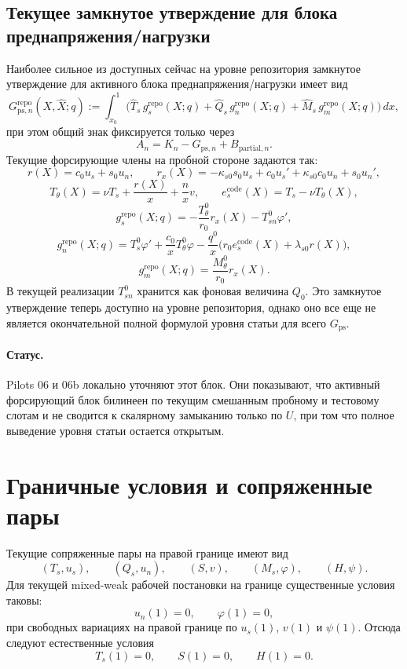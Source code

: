 \documentclass[11pt,a4paper]{article}
\begin{document}
\subsection{Текущее замкнутое утверждение для блока преднапряжения/нагрузки}
Наиболее сильное из доступных сейчас на уровне репозитория замкнутое
утверждение для активного блока преднапряжения/нагрузки имеет вид
\[
G_{\mathrm{ps},n}^{\mathrm{repo}}(X,\widehat X;q)
:= \int_{x_0}^1
\bigl( \widehat T_s\, g_s^{\mathrm{repo}}(X;q)
     + \widehat Q_s\, g_n^{\mathrm{repo}}(X;q)
     + \widehat M_s\, g_m^{\mathrm{repo}}(X;q)
\bigr)\,dx,
\]
при этом общий знак фиксируется только через
\[
A_n = K_n - G_{\mathrm{ps},n} + B_{\mathrm{partial},n}.
\]
Текущие форсирующие члены на пробной стороне задаются так:
\[
r(X)=c_0u_s+s_0u_n,
\qquad
r_x(X)= -\kappa_{s0}s_0u_s + c_0u_s' + \kappa_{s0}c_0u_n + s_0u_n',
\]
\[
T_\theta(X) = \nu T_s + \frac{r(X)}{x} + \frac{n}{x}v,
\qquad
e_s^{\mathrm{code}}(X) = T_s - \nu T_\theta(X),
\]
\[
g_s^{\mathrm{repo}}(X;q)
 = -\frac{T_\theta^0}{r_0}r_x(X) - T_{sn}^0\varphi',
\]
\[
g_n^{\mathrm{repo}}(X;q)
 = T_s^0\varphi' + \frac{c_0}{x}T_\theta^0\varphi
   - \frac{q^0}{x}\bigl(r_0 e_s^{\mathrm{code}}(X) + \lambda_{s0}r(X)\bigr),
\]
\[
g_m^{\mathrm{repo}}(X;q) = \frac{M_\theta^0}{r_0}r_x(X).
\]
В текущей реализации $T_{sn}^0$ хранится как фоновая величина $Q_0$.
Это замкнутое утверждение теперь доступно на уровне репозитория, однако оно
все еще не является окончательной полной формулой уровня статьи для всего
$G_{\mathrm{ps}}$.

\paragraph{Статус.}
Pilots 06 и 06b локально уточняют этот блок.
Они показывают, что активный форсирующий блок билинеен по текущим смешанным
пробному и тестовому слотам и не сводится к скалярному замыканию только по $U$, при том
что полное выведение уровня статьи остается открытым.

\section{Граничные условия и сопряженные пары}
Текущие сопряженные пары на правой границе имеют вид
\[
(T_s,u_s), \qquad (Q_s,u_n), \qquad (S,v), \qquad (M_s,\varphi), \qquad (H,\psi).
\]
Для текущей mixed-weak рабочей постановки на границе существенные условия таковы:
\[
u_n(1)=0, \qquad \varphi(1)=0,
\]
при свободных вариациях на правой границе по $u_s(1)$, $v(1)$ и $\psi(1)$.
Отсюда следуют естественные условия
\[
T_s(1)=0, \qquad S(1)=0, \qquad H(1)=0.
\]
\end{document}
